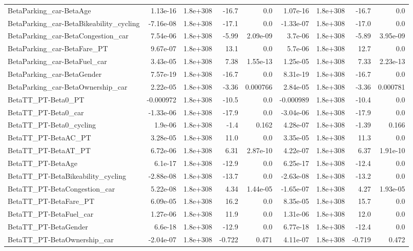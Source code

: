 \begin{tabular}{lrrrrrrrr}
BetaParking_car-BetaAge & 1.13e-16 & 1.8e+308 & -16.7 & 0.0 & 1.07e-16 & 1.8e+308 & -16.7 & 0.0 \\
BetaParking_car-BetaBikeability_cycling & -7.16e-08 & 1.8e+308 & -17.1 & 0.0 & -1.33e-07 & 1.8e+308 & -17.0 & 0.0 \\
BetaParking_car-BetaCongestion_car & 7.54e-06 & 1.8e+308 & -5.99 & 2.09e-09 & 3.7e-06 & 1.8e+308 & -5.89 & 3.95e-09 \\
BetaParking_car-BetaFare_PT & 9.67e-07 & 1.8e+308 & 13.1 & 0.0 & 5.7e-06 & 1.8e+308 & 12.7 & 0.0 \\
BetaParking_car-BetaFuel_car & 3.43e-05 & 1.8e+308 & 7.38 & 1.55e-13 & 1.25e-05 & 1.8e+308 & 7.33 & 2.23e-13 \\
BetaParking_car-BetaGender & 7.57e-19 & 1.8e+308 & -16.7 & 0.0 & 8.31e-19 & 1.8e+308 & -16.7 & 0.0 \\
BetaParking_car-BetaOwnership_car & 2.22e-05 & 1.8e+308 & -3.36 & 0.000766 & 2.84e-05 & 1.8e+308 & -3.36 & 0.000781 \\
BetaTT_PT-Beta0_PT & -0.000972 & 1.8e+308 & -10.5 & 0.0 & -0.000989 & 1.8e+308 & -10.4 & 0.0 \\
BetaTT_PT-Beta0_car & -1.33e-06 & 1.8e+308 & -17.9 & 0.0 & -3.04e-06 & 1.8e+308 & -17.9 & 0.0 \\
BetaTT_PT-Beta0_cycling & 1.9e-06 & 1.8e+308 & -1.4 & 0.162 & 4.28e-07 & 1.8e+308 & -1.39 & 0.166 \\
BetaTT_PT-BetaAC_PT & 3.28e-05 & 1.8e+308 & 11.0 & 0.0 & 3.35e-05 & 1.8e+308 & 11.3 & 0.0 \\
BetaTT_PT-BetaAT_PT & 6.72e-06 & 1.8e+308 & 6.31 & 2.87e-10 & 4.22e-07 & 1.8e+308 & 6.37 & 1.91e-10 \\
BetaTT_PT-BetaAge & 6.1e-17 & 1.8e+308 & -12.9 & 0.0 & 6.25e-17 & 1.8e+308 & -12.4 & 0.0 \\
BetaTT_PT-BetaBikeability_cycling & -2.88e-08 & 1.8e+308 & -13.7 & 0.0 & -2.63e-08 & 1.8e+308 & -13.2 & 0.0 \\
BetaTT_PT-BetaCongestion_car & 5.22e-08 & 1.8e+308 & 4.34 & 1.44e-05 & -1.65e-07 & 1.8e+308 & 4.27 & 1.93e-05 \\
BetaTT_PT-BetaFare_PT & 6.09e-05 & 1.8e+308 & 16.2 & 0.0 & 8.35e-05 & 1.8e+308 & 15.7 & 0.0 \\
BetaTT_PT-BetaFuel_car & 1.27e-06 & 1.8e+308 & 11.9 & 0.0 & 1.31e-06 & 1.8e+308 & 12.0 & 0.0 \\
BetaTT_PT-BetaGender & 6.6e-18 & 1.8e+308 & -12.9 & 0.0 & 6.77e-18 & 1.8e+308 & -12.4 & 0.0 \\
BetaTT_PT-BetaOwnership_car & -2.04e-07 & 1.8e+308 & -0.722 & 0.471 & 4.11e-07 & 1.8e+308 & -0.719 & 0.472 \\

\end{tabular}

